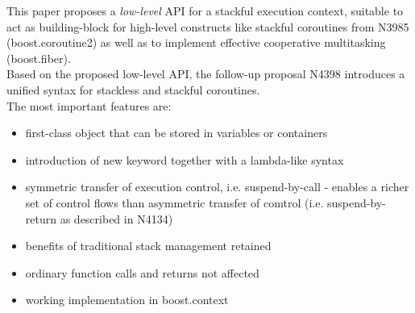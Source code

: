 This paper proposes a \emph{low-level} API for a stackful execution context, suitable
to act as building-block for high-level constructs like stackful coroutines from
N3985\cite{N3985} (boost.coroutine2\cite{bcoroutine2}) as well as to implement
effective cooperative multitasking (boost.fiber\cite{bfiber}).\\
Based on the proposed low-level API, the follow-up proposal N4398\cite{N4398}
introduces a unified syntax for stackless and stackful coroutines.\\
\newline
The most important features are:
\begin{itemize}
    \item first-class object that can be stored in variables or containers
    \item introduction of new keyword \resumable together with a lambda-like
          syntax
    \item symmetric transfer of execution control, i.e. suspend-by-call -
          enables a richer set of control flows than asymmetric transfer of
          comtrol (i.e. suspend-by-return as described in N4134)
    \item benefits of traditional stack management retained
    \item ordinary function calls and returns not affected
    \item working implementation in boost.context\cite{bcontext}
\end{itemize}
